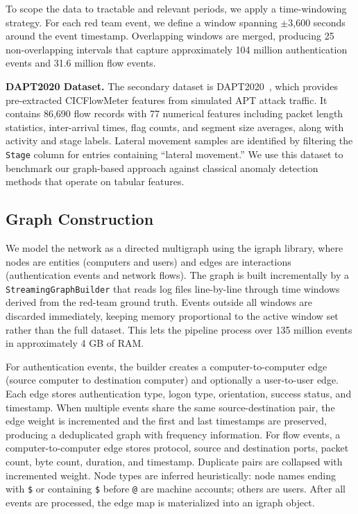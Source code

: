 To scope the data to tractable and relevant periods, we apply a time-windowing strategy. For each red team event, we define a window spanning $\pm$3,600 seconds around the event timestamp. Overlapping windows are merged, producing 25 non-overlapping intervals that capture approximately 104 million authentication events and 31.6 million flow events.

\textbf{DAPT2020 Dataset.}
The secondary dataset is DAPT2020~\cite{dapt2020}, which provides pre-extracted CICFlowMeter features from simulated APT attack traffic. It contains 86,690 flow records with 77 numerical features including packet length statistics, inter-arrival times, flag counts, and segment size averages, along with activity and stage labels. Lateral movement samples are identified by filtering the \texttt{Stage} column for entries containing ``lateral movement.'' We use this dataset to benchmark our graph-based approach against classical anomaly detection methods that operate on tabular features.

\subsection{Graph Construction}

We model the network as a directed multigraph using the igraph library, where nodes are entities (computers and users) and edges are interactions (authentication events and network flows). The graph is built incrementally by a \texttt{StreamingGraphBuilder} that reads log files line-by-line through time windows derived from the red-team ground truth. Events outside all windows are discarded immediately, keeping memory proportional to the active window set rather than the full dataset. This lets the pipeline process over 135 million events in approximately 4 GB of RAM.

For authentication events, the builder creates a computer-to-computer edge (source computer to destination computer) and optionally a user-to-user edge. Each edge stores authentication type, logon type, orientation, success status, and timestamp. When multiple events share the same source-destination pair, the edge weight is incremented and the first and last timestamps are preserved, producing a deduplicated graph with frequency information. For flow events, a computer-to-computer edge stores protocol, source and destination ports, packet count, byte count, duration, and timestamp. Duplicate pairs are collapsed with incremented weight. Node types are inferred heuristically: node names ending with \texttt{\$} or containing \texttt{\$} before \texttt{@} are machine accounts; others are users. After all events are processed, the edge map is materialized into an igraph object.

